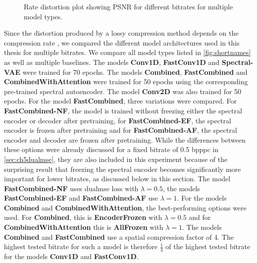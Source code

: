 \begin{figure}[!ht]
\caption{Rate distortion plot showing PSNR for different bitrates for multiple model types.}
\label{fig:ratedistortion}
\end{figure}

Since the distortion produced by a lossy compression method depends on the compression rate \citep{berger_rate-distortion_2003}, we compared the different model architectures used in this thesis for multiple bitrates. We compare all model types listed in \autoref{fig:shortnames} as well as multiple baselines. The models \textbf{Conv1D}, \textbf{FastConv1D} and \textbf{Spectral-VAE} were trained for 70 epochs. The models \textbf{Combined}, \textbf{FastCombined} and \textbf{CombinedWithAttention} were trained for 50 epochs using the corresponding pre-trained spectral autoencoder. The model \textbf{Conv2D} was also trained for 50 epochs. For the model \textbf{FastCombined}, three variations were compared. For \textbf{FastCombined-NF}, the model is trained without freezing either the spectral encoder or decoder after pretraining, for \textbf{FastCombined-EF}, the spectral encoder is frozen after pretraining and for \textbf{FastCombined-AF}, the spectral encoder and decoder are frozen after pretraining. While the differences between these options were already discussed for a fixed bitrate of 0.5 bpppc in \autoref{sec:ch5dualmse}, they are also included in this experiment because of the surprising result that freezing the spectral encoder becomes significantly more important for lower bitrates, as discussed below in this section. The model \textbf{FastCombined-NF} uses \ac{dualmse} loss with $\lambda=0.5$, the models \textbf{FastCombined-EF} and \textbf{FastCombined-AF} use $\lambda=1$. For the models \textbf{Combined} and \textbf{CombinedWithAttention}, the best-performing options were used. For \textbf{Combined}, this is \textbf{EncoderFrozen} with $\lambda=0.5$ and for \textbf{CombinedWithAttention} this is \textbf{AllFrozen} with $\lambda=1$. The models \textbf{Combined} and \textbf{FastCombined} use a spatial compression factor of 4. The highest tested bitrate for such a model is therefore $\frac{1}{4}$ of the highest tested bitrate for the models \textbf{Conv1D} and \textbf{FastConv1D}.

